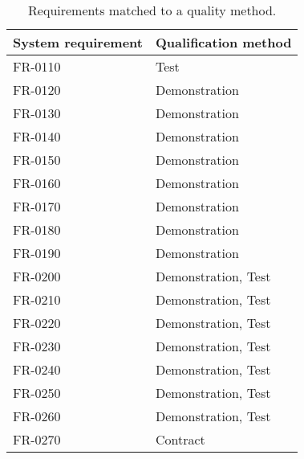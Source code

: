 \begin{table}[H]
\centering
\begin{tabular}{|l|l|}
\hline
 \textbf{System requirement} & \textbf{Qualification method} \\ \hline
 FR-0110 & Test \\  \hline
 FR-0120 & Demonstration \\  \hline
 FR-0130 & Demonstration \\  \hline
 FR-0140 & Demonstration \\  \hline
 FR-0150 & Demonstration \\  \hline
 FR-0160 & Demonstration \\  \hline
 FR-0170 & Demonstration  \\  \hline
 FR-0180 & Demonstration \\  \hline
 FR-0190 & Demonstration  \\  \hline
 FR-0200 & Demonstration, Test  \\  \hline
 FR-0210 & Demonstration, Test \\  \hline
 FR-0220 & Demonstration, Test \\  \hline
 FR-0230 & Demonstration, Test \\  \hline
 FR-0240 & Demonstration, Test \\  \hline
 FR-0250 & Demonstration, Test \\  \hline
 FR-0260 & Demonstration, Test \\  \hline               
 FR-0270 & Contract \\  \hline
\end{tabular}
\caption{Requirements matched to a quality method.}
\end{table}